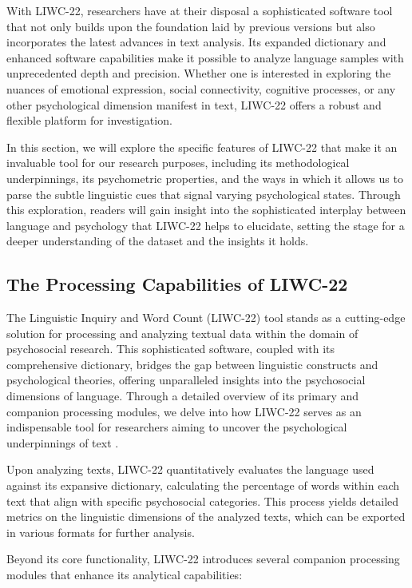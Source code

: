 With LIWC-22, researchers have at their disposal a sophisticated software tool that not only builds upon the foundation laid by previous versions but also incorporates the latest advances in text analysis. Its expanded dictionary and enhanced software capabilities make it possible to analyze language samples with unprecedented depth and precision. Whether one is interested in exploring the nuances of emotional expression, social connectivity, cognitive processes, or any other psychological dimension manifest in text, LIWC-22 offers a robust and flexible platform for investigation.

In this section, we will explore the specific features of LIWC-22 that make it an invaluable tool for our research purposes, including its methodological underpinnings, its psychometric properties, and the ways in which it allows us to parse the subtle linguistic cues that signal varying psychological states. Through this exploration, readers will gain insight into the sophisticated interplay between language and psychology that LIWC-22 helps to elucidate, setting the stage for a deeper understanding of the dataset and the insights it holds.

\subsection{The Processing Capabilities of LIWC-22}

\quad The Linguistic Inquiry and Word Count (LIWC-22) tool stands as a cutting-edge solution for processing and analyzing textual data within the domain of psychosocial research. This sophisticated software, coupled with its comprehensive dictionary, bridges the gap between linguistic constructs and psychological theories, offering unparalleled insights into the psychosocial dimensions of language. Through a detailed overview of its primary and companion processing modules, we delve into how LIWC-22 serves as an indispensable tool for researchers aiming to uncover the psychological underpinnings of text \cite{boyd2022development}.

Upon analyzing texts, LIWC-22 quantitatively evaluates the language used against its expansive dictionary, calculating the percentage of words within each text that align with specific psychosocial categories. This process yields detailed metrics on the linguistic dimensions of the analyzed texts, which can be exported in various formats for further analysis.

Beyond its core functionality, LIWC-22 introduces several companion processing modules that enhance its analytical capabilities:

